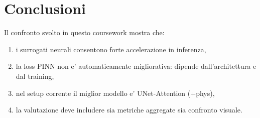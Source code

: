 \documentclass[final,3p,times]{elsarticle}
\begin{document}
\section{Conclusioni}
Il confronto svolto in questo coursework mostra che:
\begin{enumerate}
    \item i surrogati neurali consentono forte accelerazione in inferenza,
    \item la loss PINN non e' automaticamente migliorativa: dipende dall'architettura e dal training,
    \item nel setup corrente il miglior modello e' UNet-Attention (+phys),
    \item la valutazione deve includere sia metriche aggregate sia confronto visuale.
\end{enumerate}
\end{document}
